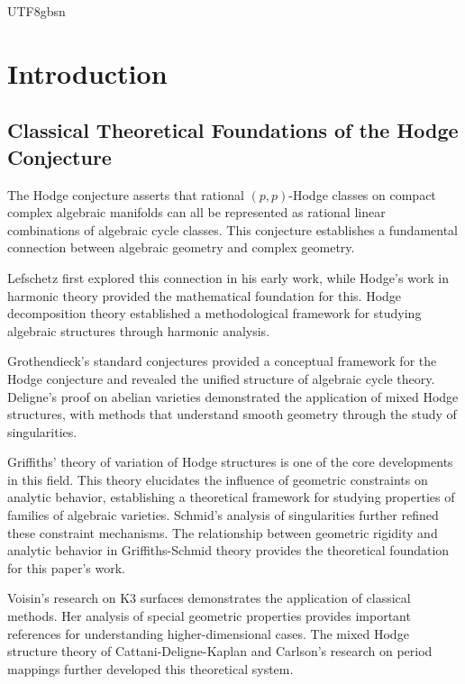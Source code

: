\documentclass[a4paper,12pt]{extarticle}
\theoremstyle{definition}
\begin{document}
\begin{CJK}{UTF8}{gbsn}
\section{Introduction}
\label{sec:introduction}

\subsection{Classical Theoretical Foundations of the Hodge Conjecture}
\label{subsec:classical_insights}

The Hodge conjecture asserts that rational $(p,p)$-Hodge classes on compact complex algebraic manifolds can all be represented as rational linear combinations of algebraic cycle classes\cite{hodge1950integrals}. This conjecture establishes a fundamental connection between algebraic geometry and complex geometry.

Lefschetz first explored this connection in his early work\cite{lefschetz1924analysis}, while Hodge's work in harmonic theory\cite{hodge1952harmonic} provided the mathematical foundation for this. Hodge decomposition theory established a methodological framework for studying algebraic structures through harmonic analysis.

Grothendieck's standard conjectures\cite{grothendieck1968standard} provided a conceptual framework for the Hodge conjecture and revealed the unified structure of algebraic cycle theory. Deligne's proof on abelian varieties\cite{deligne1982hodge} demonstrated the application of mixed Hodge structures, with methods that understand smooth geometry through the study of singularities.

Griffiths' theory of variation of Hodge structures\cite{griffiths1968periods} is one of the core developments in this field. This theory elucidates the influence of geometric constraints on analytic behavior, establishing a theoretical framework for studying properties of families of algebraic varieties. Schmid's analysis of singularities\cite{schmid1973variation} further refined these constraint mechanisms. The relationship between geometric rigidity and analytic behavior in Griffiths-Schmid theory provides the theoretical foundation for this paper's work.

Voisin's research on K3 surfaces\cite{voisin2002hodge,voisin2007hodge} demonstrates the application of classical methods. Her analysis of special geometric properties provides important references for understanding higher-dimensional cases. The mixed Hodge structure theory of Cattani-Deligne-Kaplan\cite{cattani1995mixed} and Carlson's research on period mappings\cite{carlson1987extensions} further developed this theoretical system.


\end{CJK}
\end{document}
